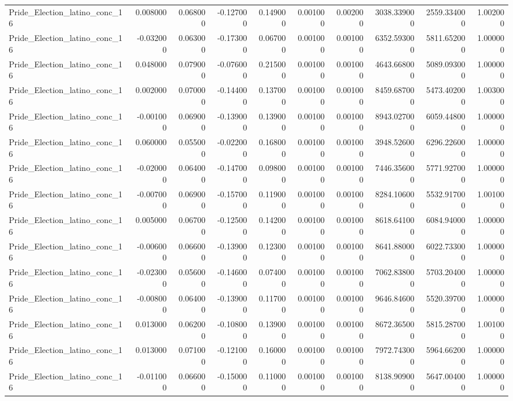 \begin{table}
\begin{tabular}{lrrrrrrrrr}
Pride_Election_latino_conc_16 & 0.008000 & 0.068000 & -0.127000 & 0.149000 & 0.001000 & 0.002000 & 3038.339000 & 2559.334000 & 1.002000 \\
Pride_Election_latino_conc_16 & -0.032000 & 0.063000 & -0.173000 & 0.067000 & 0.001000 & 0.001000 & 6352.593000 & 5811.652000 & 1.000000 \\
Pride_Election_latino_conc_16 & 0.048000 & 0.079000 & -0.076000 & 0.215000 & 0.001000 & 0.001000 & 4643.668000 & 5089.093000 & 1.000000 \\
Pride_Election_latino_conc_16 & 0.002000 & 0.070000 & -0.144000 & 0.137000 & 0.001000 & 0.001000 & 8459.687000 & 5473.402000 & 1.003000 \\
Pride_Election_latino_conc_16 & -0.001000 & 0.069000 & -0.139000 & 0.139000 & 0.001000 & 0.001000 & 8943.027000 & 6059.448000 & 1.000000 \\
Pride_Election_latino_conc_16 & 0.060000 & 0.055000 & -0.022000 & 0.168000 & 0.001000 & 0.001000 & 3948.526000 & 6296.226000 & 1.000000 \\
Pride_Election_latino_conc_16 & -0.020000 & 0.064000 & -0.147000 & 0.098000 & 0.001000 & 0.001000 & 7446.356000 & 5771.927000 & 1.000000 \\
Pride_Election_latino_conc_16 & -0.007000 & 0.069000 & -0.157000 & 0.119000 & 0.001000 & 0.001000 & 8284.106000 & 5532.917000 & 1.001000 \\
Pride_Election_latino_conc_16 & 0.005000 & 0.067000 & -0.125000 & 0.142000 & 0.001000 & 0.001000 & 8618.641000 & 6084.940000 & 1.000000 \\
Pride_Election_latino_conc_16 & -0.006000 & 0.066000 & -0.139000 & 0.123000 & 0.001000 & 0.001000 & 8641.880000 & 6022.733000 & 1.000000 \\
Pride_Election_latino_conc_16 & -0.023000 & 0.056000 & -0.146000 & 0.074000 & 0.001000 & 0.001000 & 7062.838000 & 5703.204000 & 1.000000 \\
Pride_Election_latino_conc_16 & -0.008000 & 0.064000 & -0.139000 & 0.117000 & 0.001000 & 0.001000 & 9646.846000 & 5520.397000 & 1.000000 \\
Pride_Election_latino_conc_16 & 0.013000 & 0.062000 & -0.108000 & 0.139000 & 0.001000 & 0.001000 & 8672.365000 & 5815.287000 & 1.001000 \\
Pride_Election_latino_conc_16 & 0.013000 & 0.071000 & -0.121000 & 0.160000 & 0.001000 & 0.001000 & 7972.743000 & 5964.662000 & 1.000000 \\
Pride_Election_latino_conc_16 & -0.011000 & 0.066000 & -0.150000 & 0.110000 & 0.001000 & 0.001000 & 8138.909000 & 5647.004000 & 1.000000 \\

\end{tabular}
\end{table}
